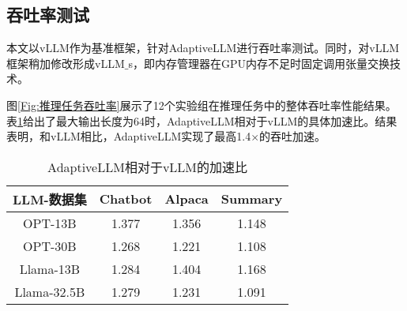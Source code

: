 


\subsection{吞吐率测试}

本文以vLLM作为基准框架，针对AdaptiveLLM进行吞吐率测试。同时，对vLLM框架稍加修改形成vLLM$\_$s，即内存管理器在GPU内存不足时固定调用张量交换技术。 \par

图\ref{Fig:推理任务吞吐率}展示了12个实验组在推理任务中的整体吞吐率性能结果。表\ref{Table:AdaptiveLLM相对于vLLM的加速比}给出了最大输出长度为64时，AdaptiveLLM相对于vLLM的具体加速比。结果表明，和vLLM相比，AdaptiveLLM实现了最高1.4$\times$的吞吐加速。 \par

\begin{table}[H]
  \centering
  \caption{AdaptiveLLM相对于vLLM的加速比}
  \label{Table:AdaptiveLLM相对于vLLM的加速比}
  \renewcommand{\arraystretch}{1.25}
  \small
  \begin{tabular}{c c c c}
    \toprule
    \textbf{LLM-数据集} & \textbf{Chatbot} & \textbf{Alpaca} & \textbf{Summary} \\
    \midrule
    OPT-13B	& 1.377 & 1.356 & 1.148 \\
    OPT-30B	& 1.268 & 1.221 & 1.108 \\
    Llama-13B & 1.284 & 1.404 & 1.168 \\
    Llama-32.5B & 1.279 & 1.231 & 1.091 \\
    \bottomrule
  \end{tabular}
\end{table}

